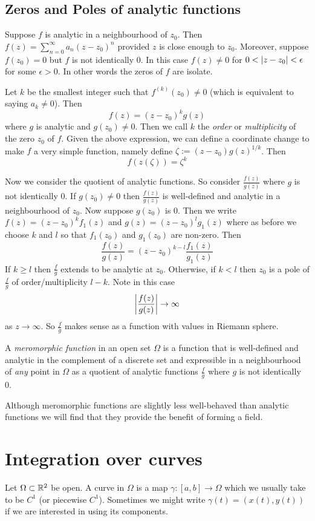 \subsection{Zeros and Poles of analytic functions}
Suppose $f$ is analytic in a neighbourhood of $z_0$. Then $f(z) = \sum_{n = 0}^\infty a_n (z - z_0)^n$ provided $z$ is close enough to $z_0$. Moreover, suppose $f(z_0) = 0$ but $f$ is not identically 0. In this case $f(z) \neq 0$ for $0 < \left|z - z_0\right| < \epsilon$ for some $\epsilon > 0$. In other words the zeros of $f$ are isolate.

Let $k$ be the smallest integer such that $f^{(k)}(z_0) \neq 0$ (which is equivalent to saying $a_k \neq 0$). Then
$$ f(z) = (z - z_0)^k g(z) $$
where $g$ is analytic and $g(z_0) \neq 0$. Then we call $k$ the \textit{order} or \textit{multiplicity} of the zero $z_0$ of $f$. Given the above expression, we can define a coordinate change to make $f$ a very simple function, namely define $\zeta := (z - z_0)g(z)^{1/k}$. Then
$$ f(z(\zeta)) = \zeta^k $$

Now we consider the quotient of analytic functions. So consider $\frac{f(z)}{g(z)}$ where $g$ is not identically 0. If $g(z_0) \neq 0$ then $\frac{f(z)}{g(z)}$ is well-defined and analytic in a neighbourhood of $z_0$. Now suppose $g(z_0)$ is 0. Then we write $f(z) = (z - z_0)^k f_1(z)$ and $g(z) = (z - z_0)^l g_1(z)$ where as before we choose $k$ and $l$ so that $f_1(z_0)$ and $g_1(z_0)$ are non-zero. Then
$$ \frac{f(z)}{g(z)} = (z - z_0)^{k - l} \frac{f_1(z)}{g_1(z)} $$
If $k \geq l$ then $\frac{f}{g}$ extends to be analytic at $z_0$. Otherwise, if $k < l$ then $z_0$ is a pole of $\frac{f}{g}$ of order/multiplicity $l - k$. Note in this case
$$ \left|\frac{f(z)}{g(z)}\right| \to \infty  $$
as $z \to \infty$. So $\frac{f}{g}$ makes sense as a function with values in Riemann sphere.

\begin{definition}
A \textit{meromorphic function} in an open set $\Omega$ is a function that is well-defined and analytic in the complement of a discrete set and expressible in a neighbourhood of \textit{any} point in $\Omega$ as a quotient of analytic functions $\displaystyle \frac{f}{g}$ where $g$ is not identically 0.
\end{definition}
Although meromorphic functions are slightly less well-behaved than analytic functions we will find that they provide the benefit of forming a field.

\section{Integration over curves}
Let $\Omega \subset \mathbb{R}^2$ be open. A curve in $\Omega$ is a map $\gamma: [a, b] \to \Omega$ which we usually take to be $C^1$ (or piecewise $C^1$). Sometimes we might write $\gamma(t) = (x(t), y(t))$ if we are interested in using its components.

